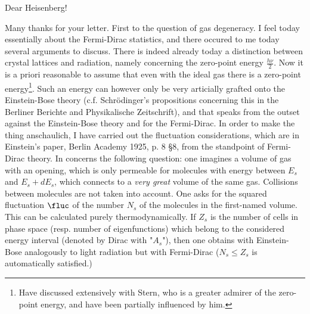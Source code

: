 \date{1926-10-19}
Dear Heisenberg!

Many thanks for your letter. First to the question of gas degeneracy. I feel today essentially  about the Fermi-Dirac statistics, and there occured to me today several arguments to discuss. There is indeed already today a distinction between crystal lattices and radiation, namely concerning the zero-point energy $\frac{h\nu}{2}$. Now it is a priori reasonable to assume that even with the ideal gas there is a zero-point energy\footnote{Have discussed extensively with Stern, who is a greater admirer of the zero-point energy, and have been partially influenced by him.}. Such an energy can however only be very articially grafted onto the Einstein-Bose theory (c.f. Schrödinger's propositions concerning this in the Berliner Berichte and Physikalische Zeitschrift), and that speaks from the outset against the Einstein-Bose theory and for the Fermi-Dirac. In order to make the thing anschaulich, I have carried out the fluctuation considerations, which are in Einstein's paper, Berlin Academy 1925, p. 8 §8, from the standpoint of Fermi-Dirac theory. In concerns the following question: one imagines a volume of gas with an opening, which is only permeable for molecules with energy between $E_s$ and $E_s + dE_s$, which connects to a \textit{very great} volume of the same gas. Collisions between molecules are not taken into account. One asks for the squared fluctuation $\fluc$ of the number $N_s$ of the  molecules in the first-named volume. This can be calculated purely thermodynamically. If $Z_s$ is the number of cells in phase space (resp. number of eigenfunctions) which belong to the considered energy interval (denoted by Dirac with "$A_s$"), then one obtains with Einstein-Bose analogously to light radiation
but with Fermi-Dirac
($N_s \leq Z_s$ is automatically satisfied.)
